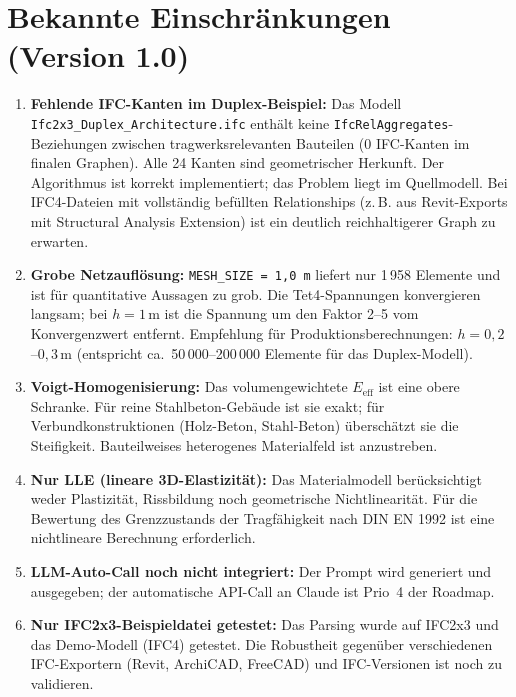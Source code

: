 \documentclass[a4paper,11pt]{article}
\begin{document}
\section{Bekannte Einschränkungen (Version 1.0)}
\label{sec:limits}

\begin{enumerate}

  \item \textbf{Fehlende IFC-Kanten im Duplex-Beispiel:} Das Modell \texttt{Ifc2x3\_Duplex\_Architecture.ifc} enthält keine \texttt{IfcRelAggregates}-Beziehungen zwischen tragwerksrelevanten Bauteilen (0 IFC-Kanten im finalen Graphen). Alle 24 Kanten sind geometrischer Herkunft. Der Algorithmus ist korrekt implementiert; das Problem liegt im Quellmodell. Bei IFC4-Dateien mit vollständig befüllten Relationships (z.\,B. aus Revit-Exports mit Structural Analysis Extension) ist ein deutlich reichhaltigerer Graph zu erwarten.

  \item \textbf{Grobe Netzauflösung:} \texttt{MESH\_SIZE = 1{,}0\,m} liefert nur 1\,958 Elemente und ist für quantitative Aussagen zu grob. Die Tet4-Spannungen konvergieren langsam; bei $h = 1$\,m ist die Spannung um den Faktor 2–5 vom Konvergenzwert entfernt. Empfehlung für Produktionsberechnungen: $h = 0{,}2$–$0{,}3$\,m (entspricht ca.\ 50\,000–200\,000 Elemente für das Duplex-Modell).

  \item \textbf{Voigt-Homogenisierung:} Das volumengewichtete $E_\text{eff}$ ist eine obere Schranke. Für reine Stahlbeton-Gebäude ist sie exakt; für Verbundkonstruktionen (Holz-Beton, Stahl-Beton) überschätzt sie die Steifigkeit. Bauteilweises heterogenes Materialfeld ist anzustreben.

  \item \textbf{Nur LLE (lineare 3D-Elastizität):} Das Materialmodell berücksichtigt weder Plastizität, Rissbildung noch geometrische Nichtlinearität. Für die Bewertung des Grenzzustands der Tragfähigkeit nach DIN EN 1992 ist eine nichtlineare Berechnung erforderlich.

  \item \textbf{LLM-Auto-Call noch nicht integriert:} Der Prompt wird generiert und ausgegeben; der automatische API-Call an Claude ist Prio~4 der Roadmap.

  \item \textbf{Nur IFC2x3-Beispieldatei getestet:} Das Parsing wurde auf IFC2x3 und das Demo-Modell (IFC4) getestet. Die Robustheit gegenüber verschiedenen IFC-Exportern (Revit, ArchiCAD, FreeCAD) und IFC-Versionen ist noch zu validieren.

\end{enumerate}
\end{document}
